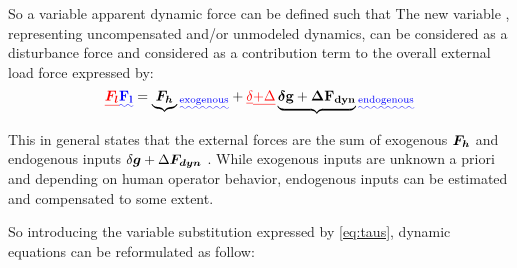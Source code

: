 So a variable apparent dynamic force \DIFdelbegin {}\DIFdelend \DIFaddbegin {}\DIFaddend can be defined   such that
\DIFdelbegin {}\DIFdelend \DIFaddbegin {}\DIFaddend The new variable \DIFdelbegin {}\DIFdelend \DIFaddbegin {}\DIFaddend ,  representing uncompensated and/or unmodeled dynamics, can be considered as a disturbance force and considered as a contribution term to the overall external load  force  \DIFdelbegin {}\DIFdelend \DIFaddbegin {}\DIFaddend expressed by:
\begin{equation}\DIFdelbegin \DIFdel{
\vects{F_l}}\DIFdelend \DIFaddbegin \DIFadd{
\vect{F_l}}\DIFaddend = \DIFdelbegin %
\DIFdelend \DIFaddbegin \underbrace{\vects{F_h}}\DIFadd{_{\text{exogenous}} }\DIFaddend +  \DIFdelbegin \DIFdel{\delta }%
\DIFdel{+ \Delta }%
\DIFdelend \DIFaddbegin \underbrace{\vects{\delta}\vect{g}  +  \vects{\Delta} \vect{F_{dyn}}}\DIFadd{_{\text{endogenous}}
}\DIFaddend \label{eq:extraForces}
\end{equation}



This in general states that the external forces are the sum of exogenous ${ \boldsymbol {F_h}} $ and endogenous inputs  $ \delta { \boldsymbol {g}} + \Delta { \boldsymbol {F_{dyn}}}$ . While exogenous inputs are unknown a priori and depending on human operator behavior, endogenous inputs can be estimated and compensated to some extent.

So introducing the variable substitution expressed by \eqref{eq:taus}, dynamic equations can be reformulated as follow:

